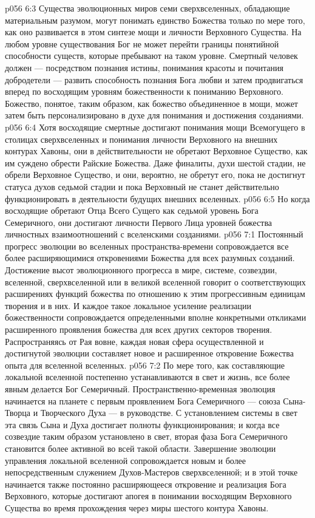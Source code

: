 \vs p056 6:3 \pc Существа эволюционных миров семи сверхвселенных, обладающие материальным разумом, могут понимать единство Божества только по мере того, как оно развивается в этом синтезе мощи и личности Верховного Существа. На любом уровне существования Бог не может перейти границы понятийной способности существ, которые пребывают на таком уровне. Смертный человек должен --- посредством познания истины, понимания красоты и почитания добродетели --- развить способность познания Бога любви и затем продвигаться вперед по восходящим уровням божественности к пониманию Верховного. Божество, понятое, таким образом, как божество объединенное в мощи, может затем быть персонализировано в духе для понимания и достижения созданиями.
\vs p056 6:4 Хотя восходящие смертные достигают понимания мощи Всемогущего в столицах сверхвселенных и понимания личности Верховного на внешних контурах Хавоны, они в действительности не обретают Верховное Существо, как им суждено обрести Райские Божества. Даже финалиты, духи шестой стадии, не обрели Верховное Существо, и они, вероятно, не обретут его, пока не достигнут статуса духов седьмой стадии и пока Верховный не станет действительно функционировать в деятельности будущих внешних вселенных.
\vs p056 6:5 Но когда восходящие обретают Отца Всего Сущего как седьмой уровень Бога Семеричного, они достигают личности Первого Лица  уровней божества личностных взаимоотношений с вселенскими созданиями.
\vs p056 7:1 Постоянный прогресс эволюции во вселенных пространства\hyp{}времени сопровождается все более расширяющимися откровениями Божества для всех разумных созданий. Достижение высот эволюционного прогресса в мире, системе, созвездии, вселенной, сверхвселенной или в великой вселенной говорит о соответствующих расширениях функций божества по отношению к этим прогрессивным единицам творения и в них. И каждое такое локальное усиление реализации божественности сопровождается определенными вполне конкретными откликами расширенного проявления божества для всех других секторов творения. Распространяясь от Рая вовне, каждая новая сфера осуществленной и достигнутой эволюции составляет новое и расширенное откровение Божества опыта для вселенной вселенных.
\vs p056 7:2 По мере того, как составляющие локальной вселенной постепенно устанавливаются в свет и жизнь, все более явным делается Бог Семеричный. Пространственно\hyp{}временная эволюция начинается на планете с первым проявлением Бога Семеричного --- союза Сына\hyp{}Творца и Творческого Духа --- в руководстве. С установлением системы в свет эта связь Сына и Духа достигает полноты функционирования; и когда все созвездие таким образом установлено в свет, вторая фаза Бога Семеричного становится более активной во всей такой области. Завершение эволюции управления локальной вселенной сопровождается новым и более непосредственным служением Духов\hyp{}Мастеров сверхвселенной; и в этой точке начинается также постоянно расширяющееся откровение и реализация Бога Верховного, которые достигают апогея в понимании восходящим Верховного Существа во время прохождения через миры шестого контура Хавоны.
